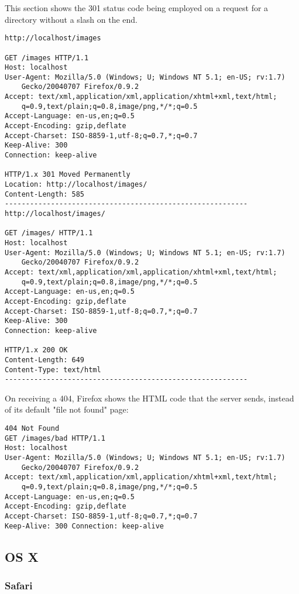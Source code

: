\documentclass[11pt]{report}
\begin{document}
This section shows the 301 status code being employed on a request for a directory without a slash on the end.

\begin{verbatim}
http://localhost/images

GET /images HTTP/1.1
Host: localhost
User-Agent: Mozilla/5.0 (Windows; U; Windows NT 5.1; en-US; rv:1.7)
	Gecko/20040707 Firefox/0.9.2
Accept: text/xml,application/xml,application/xhtml+xml,text/html;
	q=0.9,text/plain;q=0.8,image/png,*/*;q=0.5
Accept-Language: en-us,en;q=0.5
Accept-Encoding: gzip,deflate
Accept-Charset: ISO-8859-1,utf-8;q=0.7,*;q=0.7
Keep-Alive: 300
Connection: keep-alive

HTTP/1.x 301 Moved Permanently
Location: http://localhost/images/
Content-Length: 585
----------------------------------------------------------
http://localhost/images/

GET /images/ HTTP/1.1
Host: localhost
User-Agent: Mozilla/5.0 (Windows; U; Windows NT 5.1; en-US; rv:1.7)
	Gecko/20040707 Firefox/0.9.2
Accept: text/xml,application/xml,application/xhtml+xml,text/html;
	q=0.9,text/plain;q=0.8,image/png,*/*;q=0.5
Accept-Language: en-us,en;q=0.5
Accept-Encoding: gzip,deflate
Accept-Charset: ISO-8859-1,utf-8;q=0.7,*;q=0.7
Keep-Alive: 300
Connection: keep-alive

HTTP/1.x 200 OK
Content-Length: 649
Content-Type: text/html
----------------------------------------------------------
\end{verbatim}

On receiving a 404, Firefox shows the HTML code that the server sends, instead of its default "file not found" page:

\begin{verbatim}
404 Not Found
GET /images/bad HTTP/1.1
Host: localhost
User-Agent: Mozilla/5.0 (Windows; U; Windows NT 5.1; en-US; rv:1.7)
	Gecko/20040707 Firefox/0.9.2
Accept: text/xml,application/xml,application/xhtml+xml,text/html;
	q=0.9,text/plain;q=0.8,image/png,*/*;q=0.5
Accept-Language: en-us,en;q=0.5
Accept-Encoding: gzip,deflate
Accept-Charset: ISO-8859-1,utf-8;q=0.7,*;q=0.7
Keep-Alive: 300 Connection: keep-alive 
\end{verbatim}

\subsection{OS X}

\subsubsection{Safari}
\end{document}
